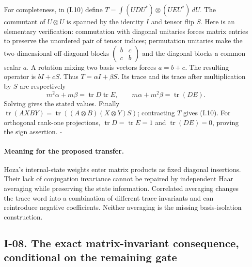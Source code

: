 \documentclass[11pt,a4paper]{article}
\theoremstyle{definition}\newtheorem{definition}{Definition}
\begin{document}
For completeness, in (I.10) define
$T=\int(UDU^*)\otimes(UEU^*)\,dU$.  The commutant of
$U\otimes U$ is spanned by the identity $I$ and tensor flip $S$.
Here is an elementary verification: commutation with diagonal unitaries
forces matrix entries to preserve the unordered pair of tensor indices;
permutation unitaries make the two-dimensional off-diagonal blocks
$\left(\begin{smallmatrix}b&c\\c&b\end{smallmatrix}\right)$ and
the diagonal blocks a common scalar $a$.  A rotation mixing two basis
vectors forces $a=b+c$.  The resulting operator is $bI+cS$.
Thus $T=\alpha I+\beta S$.  Its trace and its trace after multiplication
by $S$ are respectively
\[
 m^2\alpha+m\beta=\operatorname{tr}D\operatorname{tr}E,
 \qquad m\alpha+m^2\beta=\operatorname{tr}(DE).
\]
Solving gives the stated values.  Finally
$\operatorname{tr}(A X B Y)=
\operatorname{tr}((A\otimes B)(X\otimes Y)S)$;
contracting $T$ gives (I.10).  For orthogonal rank-one projections,
$\operatorname{tr}D=\operatorname{tr}E=1$ and
$\operatorname{tr}(DE)=0$, proving the sign assertion.
\hfill$\square$

\paragraph{Meaning for the proposed transfer.}
Hoza's internal-state weights enter matrix products as fixed
diagonal insertions.  Their lack of conjugation invariance cannot
be repaired by independent Haar averaging while preserving the
state information.  Correlated averaging changes the trace word
into a combination of different trace invariants and can reintroduce
negative coefficients.  Neither averaging is the missing
basis-isolation construction.

\subsection{I-08. The exact matrix-invariant consequence, conditional on the remaining gate}
\label{I-08}
\end{document}
